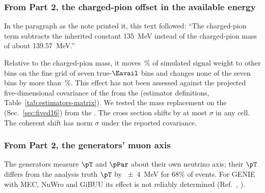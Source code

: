 \subsubsection{From Part 2, the charged-pion offset in the available energy}
In the paragraph as the note printed it, this text followed: ``The charged-pion term subtracts the inherited constant \SI{135}{MeV} instead of the charged-pion mass of about \SI{139.57}{MeV}.''\par
Relative to the charged-pion mass, it moves \,\% of simulated signal weight to other bins on the fine grid of seven true-$\Eavail$ bins and changes none of the seven bins by more than \,\%. This effect has not been assessed against the projected five-dimensional covariance of the \resFiveAxis{} from the \estPurity{} (estimator definitions, Table~\ref{tab:estimators-matrix}). We tested the mass replacement on the \resSixteen{} (Sec.~\ref{sec:fived16}) from the \estMultiD{}. The cross section shifts by at most $\sigma$ in any cell. The coherent shift has norm $\sigma$ under the reported covariance.

\subsubsection{From Part 2, the generators' muon axis}
The generators measure $\pT$ and $\pPar$ about their own neutrino axis; their $\pT$ differs from the analysis truth $\pT$ by \SI{\pm4}{MeV} for 68\% of events. For GENIE with MEC, NuWro and GiBUU its effect is not reliably determined (Ref.~\cite{NoteRecords2026}, ).

